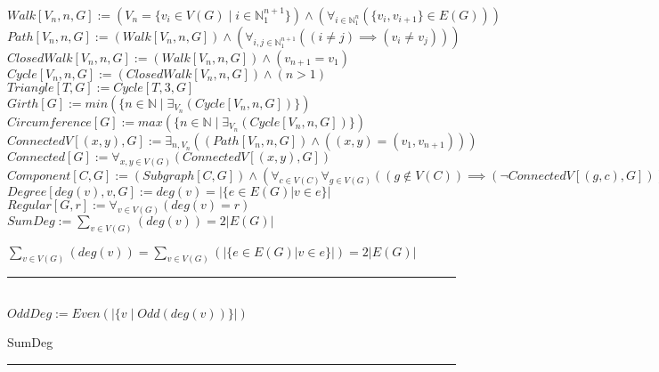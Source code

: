 \documentclass{book}
\newcommand{\abr}{:=}
\newcommand{\pr}[1]{\left(#1\right)}
\newcommand{\st}{\mathbin{|}}
\newcommand{\utup}[1]{\{#1\}}
\begin{document}
$Walk[V_n, n, G] \abr \pr{V_n = \{v_i \in V(G) \st i \in \mathbb{N}_1^{n + 1}\}} \land \pr{\forall_{i \in \mathbb{N}_1^n}\pr{\utup{v_i, v_{i + 1}} \in E(G)}}$ \\
$Path[V_n, n, G] \abr (Walk[V_n, n, G]) \land \pr{\forall_{i, j \in \mathbb{N}_1^{n + 1}}\pr{(i \neq j) \implies (v_i \neq v_j)}}$ \\
$ClosedWalk[V_n, n, G] \abr (Walk[V_n, n, G]) \land (v_{n + 1} = v_1)$ \\
$Cycle[V_n, n, G] \abr (ClosedWalk[V_n, n, G]) \land (n > 1)$ \\
$Triangle[T, G] \abr Cycle[T, 3, G]$ \\
$Girth[G] \abr min\pr{\{n \in \mathbb{N} \st \exists_{V_n}(Cycle[V_n, n, G])\}}$ \\
$Circumference[G] \abr max\pr{\{n \in \mathbb{N} \st \exists_{V_n}(Cycle[V_n, n, G])\}}$ \\

$ConnectedV[(x, y), G] \abr \exists_{n, V_n}\pr{(Path[V_n, n, G]) \land \pr{(x, y) = (v_1, v_{n + 1})}}$ \\
$Connected[G] \abr \forall_{x, y \in V(G)}\pr{ConnectedV[(x, y), G]}$ \\
$Component[C, G] \abr (Subgraph[C, G]) \land \pr{\forall_{c \in V(C)} \forall_{g \in V(G)}\pr{\pr{g \notin V(C)} \implies \pr{\lnot ConnectedV[(g, c), G]}}}$ \\

$Degree[deg(v), v, G] \abr deg(v) = |\{e \in E(G) | v \in e\}|$ \\
$Regular[G, r] \abr \forall_{v \in V(G)}\pr{deg(v) = r}$ \\

$SumDeg \abr \sum_{v \in V(G)}\pr{deg(v)} = 2 |E(G)|$ \\
\begin{enumerate}
  \lit $\sum_{v \in V(G)}\pr{deg(v)} = \sum_{v \in V(G)}\pr{|\{e \in E(G) | v \in e\}|} = 2 |E(G)|$ \\
\end{enumerate} \vspace{.75mm} \hrule \vspace{.75mm} \ \\ 

$OddDeg \abr Even\pr{|\{v \st Odd\pr{deg(v)}\}|}$ \\
\begin{enumerate}
  \lit SumDeg
\end{enumerate} \vspace{.75mm} \hrule \vspace{.75mm} \ \\ 
\end{document}
